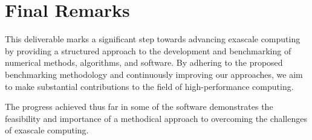 \section*{Final Remarks}

This deliverable marks a significant step towards advancing exascale computing by providing a structured approach to the development and benchmarking of numerical methods, algorithms, and software. By adhering to the proposed benchmarking methodology and continuously improving our approaches, we aim to make substantial contributions to the field of high-performance computing.

The progress achieved thus far in some of the software demonstrates the feasibility and importance of a methodical approach to overcoming the challenges of exascale computing. 


